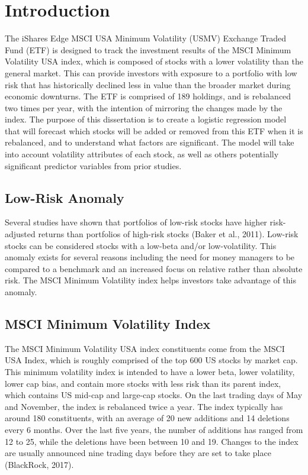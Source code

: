 \documentclass[12pt,twoside]{reedthesis}
\theoremstyle{definition}
\theoremstyle{definition}
\theoremstyle{definition}
\theoremstyle{remark}
\begin{document}
\chapter{Introduction}\label{introduction}

The iShares Edge MSCI USA Minimum Volatility (USMV) Exchange Traded Fund
(ETF) is designed to track the investment results of the MSCI Minimum
Volatility USA index, which is composed of stocks with a lower
volatility than the general market. This can provide investors with
exposure to a portfolio with low risk that has historically declined
less in value than the broader market during economic downturns. The ETF
is comprised of 189 holdings, and is rebalanced two times per year, with
the intention of mirroring the changes made by the index. The purpose of
this dissertation is to create a logistic regression model that will
forecast which stocks will be added or removed from this ETF when it is
rebalanced, and to understand what factors are significant. The model
will take into account volatility attributes of each stock, as well as
others potentially significant predictor variables from prior studies.

\section{Low-Risk Anomaly}\label{low-risk-anomaly}

Several studies have shown that portfolios of low-risk stocks have
higher risk-adjusted returns than portfolios of high-risk stocks (Baker
et al., 2011). Low-risk stocks can be considered stocks with a low-beta
and/or low-volatility. This anomaly exists for several reasons including
the need for money managers to be compared to a benchmark and an
increased focus on relative rather than absolute risk. The MSCI Minimum
Volatility index helps investors take advantage of this anomaly.

\section{MSCI Minimum Volatility
Index}\label{msci-minimum-volatility-index}

The MSCI Minimum Volatility USA index constituents come from the MSCI
USA Index, which is roughly comprised of the top 600 US stocks by market
cap. This minimum volatility index is intended to have a lower beta,
lower volatility, lower cap bias, and contain more stocks with less risk
than its parent index, which contains US mid-cap and large-cap stocks.
On the last trading days of May and November, the index is rebalanced
twice a year. The index typically has around 180 constituents, with an
average of 20 new additions and 14 deletions every 6 months. Over the
last five years, the number of additions has ranged from 12 to 25, while
the deletions have been between 10 and 19. Changes to the index are
usually announced nine trading days before they are set to take place
(BlackRock, 2017).
\end{document}

